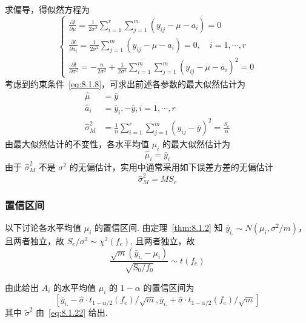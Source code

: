 求偏导，得似然方程为
\begin{equation*}
  \begin{cases}
    \frac{\partial l}{\partial \mu} =\frac{1}{2 \sigma^{2}} \sum_{i=1}^{r} \sum_{j=1}^{m}\left(y_{i j}-\mu-a_{i}\right)=0 \\
    \frac{\partial l}{\partial a_{i}} =\frac{1}{2 \sigma^{2}} \sum_{j=1}^{m}\left(y_{i j}-\mu-a_{i}\right)=0, \quad i=1, \cdots, r\\
    \frac{\partial l}{\partial \sigma^{2}} =-\frac{n}{2 \sigma^{2}}+\frac{1}{2 \sigma^{4}} \sum_{i=1}^{m} \sum_{j=1}^{m}\left(y_{i j}-\mu-a_{i}\right)^{2}=0
  \end{cases}
\end{equation*}
考虑到约束条件~\eqref{eq:8.1.8}，可求出前述各参数的最大似然估计为
\begin{equation}
  \label{eq:8.1.20}
  \begin{split}
    \hat{\mu} &= \bar{y}\\
    \hat{a}_{i} & =\bar{y}_{i},-\bar{y}, i=1, \cdots, r \\
    \hat{\sigma}_{M}^{2} &= \frac{1}{n} \sum_{i=1}^{r} \sum_{j=1}^{m}\left(y_{i j}-\bar{y}\right)^{2}=\frac{S_{e}}{n}
  \end{split}
\end{equation}
由最大似然估计的不变性，各水平均值 $\mu_i$ 的最大似然估计为
\begin{equation}
  \label{eq:8.1.21}
  \hat{\mu}_{i}=\bar{y}_{i}
\end{equation}
由于 $\hat{\sigma}_{M}^{2}$ 不是 $\sigma^2$ 的无偏估计，实用中通常采用如下误差方差的无偏估计
\begin{equation}
  \label{eq:8.1.22}
  \hat{\sigma}_{M}^{2} = M S_{e}
\end{equation}

\subsubsection{置信区间}

以下讨论各水平均值 $\mu_i$ 的置信区间. 由定理~\ref{thm:8.1.2} 知 $\bar{y}_{i.} \sim N (\mu_{i}, \sigma^{2}/m)$，且两者独立，故 $S_e/\sigma^2 \sim \chi^2(f_e)$, 且两者独立，故
\begin{equation}
  \frac{\sqrt{m}\left(\bar{y}_{i.}-\mu_{i}\right)}{\sqrt{\mathrm{S}_{0} / f_{0}}} \sim t\left(f_{e}\right)
\end{equation}

由此给出 $A_i$ 的水平均值 $\mu_i$ 的 $1-\alpha$ 的置信区间为
\begin{equation}\label{eq:8.1.23}
  \left[\bar{y}_{i.}-\hat{\sigma} \cdot t_{1-\alpha / 2}(f_{e}) / \sqrt{m}, \bar{y}_{i.}+\hat{\sigma} \cdot t_{1-\alpha / 2}(f_{e}) / \sqrt{m}\right]
\end{equation}
其中 $\tilde{\sigma}^2$ 由~\eqref{eq:8.1.22} 给出.


